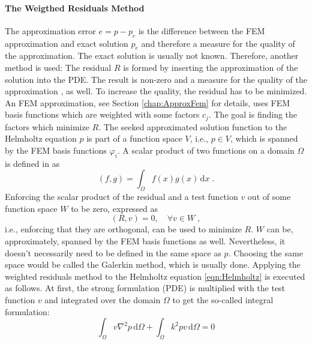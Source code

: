 \documentclass[%
  a4paper,oneside,%
  11pt,%
  smallchapters,
  style=printdev,
  extramargin,
  green,%
  rgb, <cmyk>
  ]{tubsbook}
\begin{document}
\paragraph{The Weigthed Residuals Method}
The approximation error $e = p - p_e$ is the difference between the FEM approximation and exact solution $p_e$ and therefore a measure for the quality of the approximation. The exact solution is usually not known. Therefore, another method is used: The residual $R$ is formed by inserting the approximation of the solution into the PDE. The result is non-zero and a measure for the quality of the approximation \cite{langtangen2019}, as well. To increase the quality, the residual has to be minimized. 
An FEM approximation, see Section \ref{chap:ApproxFem} for details, uses FEM basis functions which are weighted with some factors $c_j$. The goal is finding the factors which minimize $R$. The seeked approximated solution function to the Helmholtz equation $p$ is part of a function space $V$, i.e., $p \in V$, which is spanned by the FEM basis functions $\varphi_i$. A scalar product of two functions on a domain $\Omega$ is defined in \cite[p.145]{langtangen2019} as 
\begin{equation}
(f,g) = \int_{\Omega}f(x) g(x) \, \mathrm{d}x \;.
\end{equation}
Enforcing the scalar product of the residual and a test function $v$ out of some function space $W$ to be zero, expressed as
\begin{equation}
(R,v) = 0, \quad \forall v \in W \;,
\end{equation}
i.e., enforcing that they are orthogonal, can be used to minimize $R$. $W$ can be, approximately, spanned by the FEM basis functions as well. Nevertheless, it doesn't necessarily need to be defined in the same space as $p$. Choosing the same space would be called the Galerkin method, which is usually done. Applying the weighted residuals method to the Helmholtz equation \eqref{eqn:Helmholtz} is executed as follows.
At first, the strong formulation (PDE) is multiplied with the test function $v$ and integrated over the domain $\Omega$ to get the so-called integral formulation:
\begin{equation}
\int_{\Omega} v \nabla^2 p \,\mathrm{d}\Omega + \int_{\Omega} k^2 pv \,\mathrm{d}\Omega = 0
\label{eqn:IntForm}
\end{equation}
%
\end{document}
